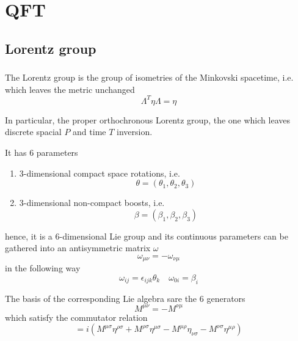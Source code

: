 \part{QFT}

\chapter{Lorentz group}

\section{}

    The Lorentz group is the group of isometries of the Minkovski spacetime, i.e. which leaves the metric unchanged
    \begin{equation*}
        \Lambda^T \eta \Lambda = \eta
    \end{equation*}

    In particular, the proper orthochronous Lorentz group, the one which leaves discrete spacial $P$ and time $T$ inversion. 

    It has $6$ parameters 
    \begin{enumerate}
        \item $3$-dimensional compact space rotations, i.e. 
            \begin{equation*}
                \theta = (\theta_1, \theta_2, \theta_3)
            \end{equation*}
        \item $3$-dimensional non-compact boosts, i.e. 
            \begin{equation*}
                \beta = (\beta_1, \beta_2, \beta_3)
            \end{equation*}
    \end{enumerate}
    hence, it is a $6$-dimensional Lie group and its continuous parameters can be gathered into an antisymmetric matrix $\omega$
    \begin{equation*}
        \omega_{\mu \nu} = - \omega_{\nu \mu}
    \end{equation*}
    in the following way
    \begin{equation*}
        \omega_{ij} = \epsilon_{ijk} \theta_k \quad \omega_{0i} = \beta_i
    \end{equation*}

    The basis of the corresponding Lie algebra sare the $6$ generators 
    \begin{equation*}
        M^{\mu\nu} = -M^{\nu\mu}
    \end{equation*}
    which satisfy the commutator relation 
    \begin{equation*}
        [M^{\mu\nu}, M^{\rho\sigma}] = i (M^{\mu\sigma} \eta^{\rho\sigma} + M^{\rho\sigma} \eta^{\mu\sigma} - M^{\mu\rho} \eta_{\nu\sigma} - M^{\nu\sigma} \eta^{\mu\rho})
    \end{equation*}


